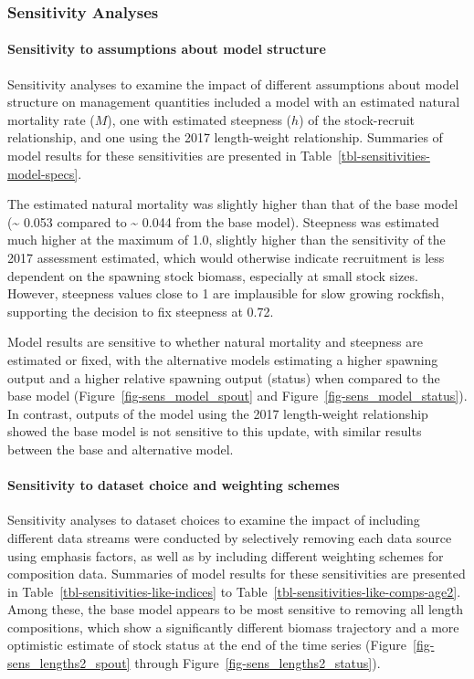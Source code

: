 \documentclass[
]{scrartcl}
\let\oldparagraph\paragraph
\renewcommand{\paragraph}[1]{\oldparagraph{#1}\mbox{}}
\begin{document}
\subsubsection{Sensitivity Analyses}\label{sensitivity-analyses}

\paragraph{Sensitivity to assumptions about model
structure}\label{sensitivity-to-assumptions-about-model-structure}

Sensitivity analyses to examine the impact of different assumptions
about model structure on management quantities included a model with an
estimated natural mortality rate (\(M\)), one with estimated steepness
(\(h\)) of the stock-recruit relationship, and one using the 2017
length-weight relationship. Summaries of model results for these
sensitivities are presented in
Table~\ref{tbl-sensitivities-model-specs}.

The estimated natural mortality was slightly higher than that of the
base model (\textasciitilde{} 0.053 compared to \textasciitilde{} 0.044
from the base model). Steepness was estimated much higher at the maximum
of 1.0, slightly higher than the sensitivity of the 2017 assessment
estimated, which would otherwise indicate recruitment is less dependent
on the spawning stock biomass, especially at small stock sizes. However,
steepness values close to 1 are implausible for slow growing rockfish,
supporting the decision to fix steepness at 0.72.

Model results are sensitive to whether natural mortality and steepness
are estimated or fixed, with the alternative models estimating a higher
spawning output and a higher relative spawning output (status) when
compared to the base model (Figure~\ref{fig-sens_model_spout} and
Figure~\ref{fig-sens_model_status}). In contrast, outputs of the model
using the 2017 length-weight relationship showed the base model is not
sensitive to this update, with similar results between the base and
alternative model.

\paragraph{Sensitivity to dataset choice and weighting
schemes}\label{sensitivity-to-dataset-choice-and-weighting-schemes}

Sensitivity analyses to dataset choices to examine the impact of
including different data streams were conducted by selectively removing
each data source using emphasis factors, as well as by including
different weighting schemes for composition data. Summaries of model
results for these sensitivities are presented in
Table~\ref{tbl-sensitivities-like-indices} to
Table~\ref{tbl-sensitivities-like-comps-age2}. Among these, the base
model appears to be most sensitive to removing all length compositions,
which show a significantly different biomass trajectory and a more
optimistic estimate of stock status at the end of the time series
(Figure~\ref{fig-sens_lengths2_spout} through
Figure~\ref{fig-sens_lengths2_status}).
\end{document}
